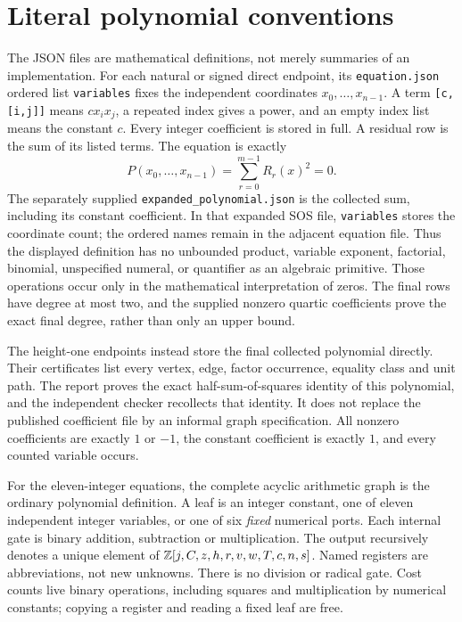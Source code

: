 \section{Literal polynomial conventions}
The JSON files are mathematical definitions, not merely summaries of an implementation. For each natural or signed direct endpoint, its \nolinkurl{equation.json} ordered list \texttt{variables} fixes the independent coordinates $x_0,\ldots,x_{n-1}$. A term \texttt{[c,[i,j]]} means $c x_i x_j$, a repeated index gives a power, and an empty index list means the constant $c$. Every integer coefficient is stored in full. A residual row is the sum of its listed terms. The equation is exactly
\[
 P(x_0,\ldots,x_{n-1})=\sum_{r=0}^{m-1}R_r(x)^2=0.
\]
The separately supplied \nolinkurl{expanded_polynomial.json} is the collected sum, including its constant coefficient. In that expanded SOS file, \texttt{variables} stores the coordinate count; the ordered names remain in the adjacent equation file. Thus the displayed definition has no unbounded product, variable exponent, factorial, binomial, unspecified numeral, or quantifier as an algebraic primitive. Those operations occur only in the mathematical interpretation of zeros. The final rows have degree at most two, and the supplied nonzero quartic coefficients prove the exact final degree, rather than only an upper bound.

The height-one endpoints instead store the final collected polynomial directly. Their certificates list every vertex, edge, factor occurrence, equality class and unit path. The report proves the exact half-sum-of-squares identity of this polynomial, and the independent checker recollects that identity. It does not replace the published coefficient file by an informal graph specification. All nonzero coefficients are exactly $1$ or $-1$, the constant coefficient is exactly $1$, and every counted variable occurs.

For the eleven-integer equations, the complete acyclic arithmetic graph is the ordinary polynomial definition. A leaf is an integer constant, one of eleven independent integer variables, or one of six \emph{fixed} numerical ports. Each internal gate is binary addition, subtraction or multiplication. The output recursively denotes a unique element of $\mathbb Z[j,C,z,h,r,v,w,T,c,n,s]$. Named registers are abbreviations, not new unknowns. There is no division or radical gate. Cost counts live binary operations, including squares and multiplication by numerical constants; copying a register and reading a fixed leaf are free.

